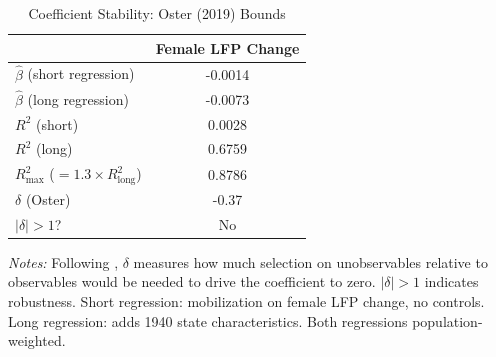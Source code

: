 \begin{table}[htbp]
\centering
\caption{Coefficient Stability: Oster (2019) Bounds}
\label{tab:oster}
\small
\begin{tabular}{lc}
\hline\hline
 & Female LFP Change \\
\hline
$\hat{\beta}$ (short regression) & -0.0014 \\
$\hat{\beta}$ (long regression) & -0.0073 \\
$R^2$ (short) & 0.0028 \\
$R^2$ (long) & 0.6759 \\
$R^2_{\max}$ ($= 1.3 \times R^2_{\text{long}}$) & 0.8786 \\[3pt]
$\delta$ (Oster) & -0.37 \\
\hline
$|\delta| > 1$? & No \\
\hline\hline
\end{tabular}
\begin{tablenotes}
\small
\item \textit{Notes:} Following \citet{oster2019unobservable}, $\delta$ measures how much selection on unobservables relative to observables would be needed to drive the coefficient to zero. $|\delta| > 1$ indicates robustness. Short regression: mobilization on female LFP change, no controls. Long regression: adds 1940 state characteristics. Both regressions population-weighted.
\end{tablenotes}
\end{table}
